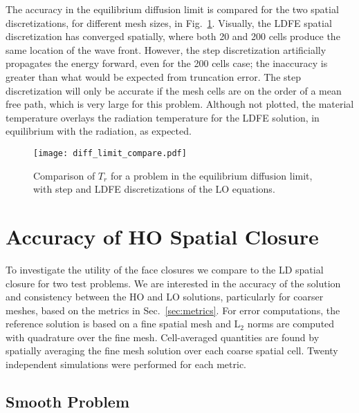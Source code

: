 The accuracy in the equilibrium diffusion limit is compared for the two spatial
discretizations, for different mesh sizes, in Fig.~\ref{fig:diff_limit}.  Visually, 
the LDFE spatial discretization has converged spatially, where both 20 and 200 cells
produce the same location of the wave front.  However, the step
discretization artificially propagates the energy forward, even for the 200 cells case; the inaccuracy is greater than
what would be expected from truncation error.  The step discretization will
only be accurate if the mesh cells are on the order of a mean free path, which is very large for this
problem.  Although not plotted, the material temperature overlays the radiation
temperature for the LDFE solution, in equilibrium with the radiation, as expected.
\begin{figure}[H]
    \centering
    \texttt{[image: diff\_limit\_compare.pdf]}
    \caption{\label{fig:diff_limit}Comparison of $T_r$ for a problem in the equilibrium
    diffusion limit, with step and LDFE discretizations of the LO
equations.}
\end{figure}

\section{Accuracy of HO Spatial Closure}

To investigate the utility of the face closures we compare to the LD spatial
closure for two test problems.  We are interested in the accuracy of the solution and
consistency between the HO and LO solutions, particularly for coarser meshes,
based on the metrics in Sec.~\ref{sec:metrics}. For error computations, the reference
solution is based on a fine spatial mesh and L$_2$ norms are computed with quadrature over
the fine mesh.  Cell-averaged quantities are found by spatially averaging the fine mesh solution over
each coarse spatial cell. Twenty independent simulations were performed for each metric.

\subsection{Smooth Problem}

